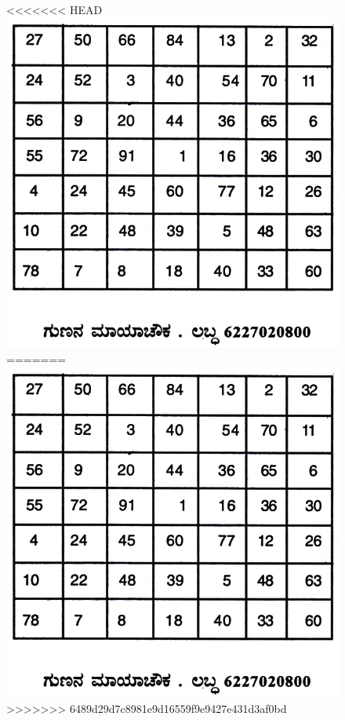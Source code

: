 \begin{figure}[H]
<<<<<<< HEAD
\includegraphics{src/figures/chap7/fig7-25.jpg}
=======
\includegraphics[scale=0.8]{src/figures/chap7/fig7.25.jpg}
>>>>>>> 6489d29d7c8981e9d16559f9e9427e431d3af0bd
\end{figure}

